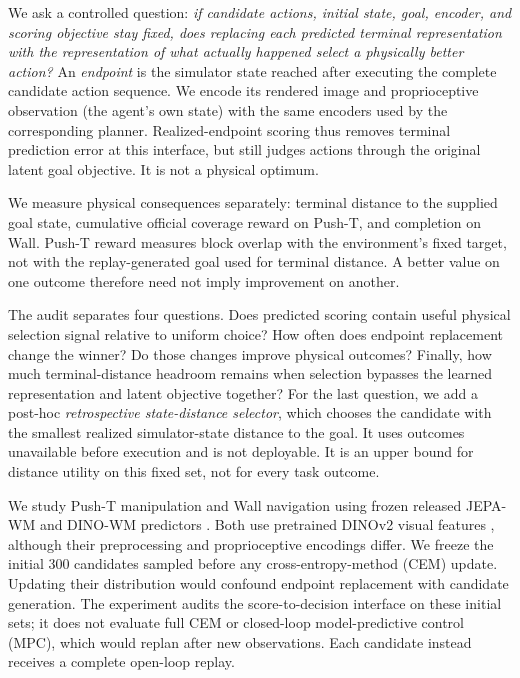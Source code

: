 \documentclass{article}
\begin{document}
We ask a controlled question: \emph{if candidate actions, initial state, goal, encoder,
and scoring objective stay fixed, does replacing each predicted terminal
representation with the representation of what actually happened select a
physically better action?} An \emph{endpoint} is the simulator state reached
after executing the complete candidate action sequence. We encode its rendered
image and proprioceptive observation (the agent's own state) with the same
encoders used by the corresponding planner. Realized-endpoint scoring thus
removes terminal prediction error at this interface, but still judges actions
through the original latent goal objective. It is not a physical optimum.

We measure physical consequences separately: terminal distance to the supplied
goal state, cumulative official coverage reward on Push-T, and completion on
Wall. Push-T reward measures block overlap with the environment's fixed target,
not with the replay-generated goal used for terminal distance. A better value
on one outcome therefore need not imply improvement on another.

The audit separates four questions. Does predicted scoring contain useful
physical selection signal relative to uniform choice? How often does endpoint
replacement change the winner? Do those changes improve physical outcomes?
Finally, how much terminal-distance headroom remains when selection bypasses
the learned representation and latent objective together? For the last question,
we add a post-hoc \emph{retrospective state-distance selector}, which chooses the
candidate with the smallest realized simulator-state distance to the goal.
It uses outcomes unavailable before execution and is not deployable. It is an
upper bound for distance utility on this fixed set, not for every task outcome.

We study Push-T manipulation and Wall navigation using frozen released JEPA-WM and
DINO-WM predictors \citep{terver2026drives,pmlr-v267-zhou25t}. Both use pretrained
DINOv2 visual features \citep{oquab2023dinov2}, although their preprocessing and
proprioceptive encodings differ. We freeze the initial 300 candidates sampled
before any cross-entropy-method (CEM) update. Updating their distribution would
confound endpoint replacement with candidate generation. The experiment audits
the score-to-decision interface on these initial sets; it does not evaluate
full CEM or closed-loop model-predictive control (MPC), which would replan after
new observations. Each candidate instead receives a complete open-loop replay.
\end{document}
